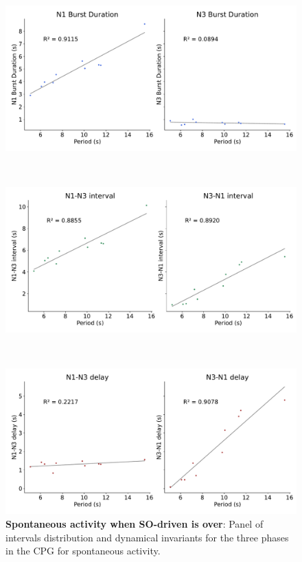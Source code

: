 \begin{figure}[htbp]
\begin{minipage}[b]{0.53\textwidth}
		\centering
		\begin{minipage}[b]{\textwidth}
			\centering
			\includegraphics[width=\textwidth]{./invariants/data/SUSSEX/prep4_so_no_driven/images/prep4_so_no_driven_durations.pdf}
		\end{minipage}\\
		\begin{minipage}[b]{\textwidth}
			\centering
			\includegraphics[width=\textwidth]{./invariants/data/SUSSEX/prep4_so_no_driven/images/prep4_so_no_driven_intervals.pdf}
		\end{minipage}\\
		\begin{minipage}[b]{\textwidth}
			\centering
			\includegraphics[width=\textwidth]{./invariants/data/SUSSEX/prep4_so_no_driven/images/prep4_so_no_driven_delays.pdf}
		\end{minipage}
	\end{minipage}
	\caption{\textbf{Spontaneous activity when SO-driven is over}: Panel of intervals distribution and dynamical invariants for the three phases in the CPG for spontaneous activity.}
	\label{fig:no so spontaneous invariants}
\end{figure}
 	
